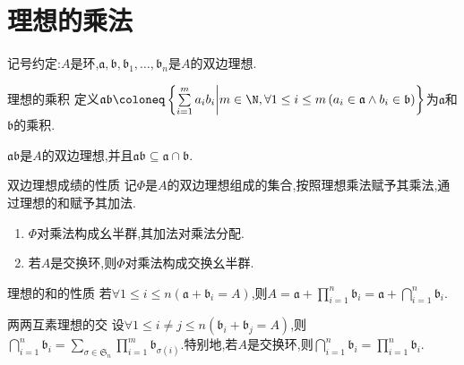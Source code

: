 \section{理想的乘法}

记号约定:$A$是环,$\mathfrak{a},\mathfrak{b},\mathfrak{b}_{1},\ldots,\mathfrak{b}_{n}$是$A$的双边理想.

\begin{definition}{理想的乘积}{}
	定义$\mathfrak{a}\mathfrak{b}\coloneq\left\{\sum\limits_{i=1}^{m}a_{i}b_{i}\middle|m\in\N,\forall 1\leq i\leq m\left(a_{i}\in\mathfrak{a}\wedge b_{i}\in\mathfrak{b}\right)\right\}$为$\mathfrak{a}$和$\mathfrak{b}$的乘积.
\end{definition}

\begin{proposition}{}{}
	$\mathfrak{a}\mathfrak{b}$是$A$的双边理想,并且$\mathfrak{a}\mathfrak{b}\subseteq\mathfrak{a}\cap\mathfrak{b}$.
\end{proposition}

\begin{proposition}{双边理想成绩的性质}{}
	记$\Phi$是$A$的双边理想组成的集合,按照理想乘法赋予其乘法,通过理想的和赋予其加法.
	\begin{enumerate}
		\item $\Phi$对乘法构成幺半群,其加法对乘法分配.
		\item 若$A$是交换环,则$\Phi$对乘法构成交换幺半群.
	\end{enumerate}
\end{proposition}

\begin{proposition}{理想的和的性质}{}
	若$\forall 1\leq i\leq n\left(\mathfrak{a}+\mathfrak{b}_{i}=A\right)$,则$A=\mathfrak{a}+\prod\limits_{i=1}^{n}\mathfrak{b}_{i}=\mathfrak{a}+\bigcap\limits_{i=1}^{n}\mathfrak{b}_{i}$.
\end{proposition}

\begin{proposition}{两两互素理想的交}{}
	设$\forall 1\leq i\neq j\leq n\left(\mathfrak{b}_{i}+\mathfrak{b}_{j}=A\right)$,则$\bigcap\limits_{i=1}^{n}\mathfrak{b}_{i}=\sum\limits_{\sigma\in\mathfrak{S}_{n}}\prod\limits_{i=1}^{m}\mathfrak{b}_{\sigma\left(i\right)}$.特别地,若$A$是交换环,则$\bigcap\limits_{i=1}^{n}\mathfrak{b}_{i}=\prod\limits_{i=1}^{n}\mathfrak{b}_{i}$.
\end{proposition}

















